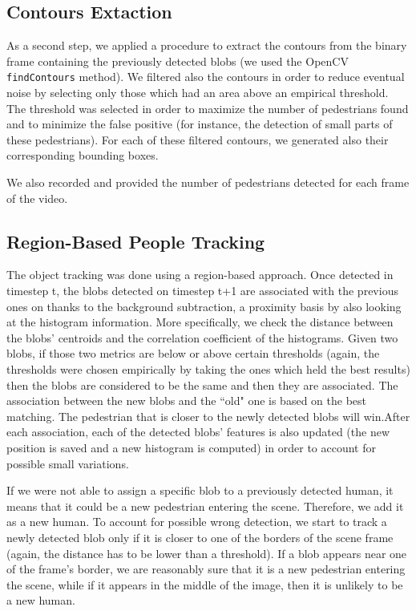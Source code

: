 \documentclass[runningheads]{llncs}
\begin{document}
\subsection{Contours Extaction}
As a second step, we applied a procedure to extract the contours from the binary frame containing the previously detected blobs (we used the OpenCV \texttt{findContours} \cite{findcontours} method). We filtered also the contours in order to reduce eventual noise by selecting only those which had an area above an empirical threshold. The threshold was selected in order to maximize the number of pedestrians found and to minimize the false positive (for instance, the detection of small parts of these pedestrians).  For each of these filtered contours, we generated also their corresponding bounding boxes.

We also recorded and provided the number of pedestrians detected for each frame of the video. 


\subsection{Region-Based People Tracking}

The object tracking was done using a region-based approach. Once detected in timestep t, the blobs detected on timestep t+1 are associated with the previous ones on thanks to the background subtraction, a proximity basis by also looking at the histogram information. More specifically, we check the distance between the blobs' centroids and the correlation coefficient of the histograms. Given two blobs, if those two metrics are below or above certain thresholds (again, the thresholds were chosen empirically by taking the ones which held the best results) then the blobs are considered to be the same and then they are associated. The association between the new blobs and the ``old" one is based on the best matching. The pedestrian that is closer to the newly detected blobs will win.After each association, each of the detected blobs' features is also updated (the new position is saved and a new histogram is computed) in order to account for possible small variations.

If we were not able to assign a specific blob to a previously detected human, it means that it could be a new pedestrian entering the scene. Therefore, we add it as a new human. To account for possible wrong detection, we start to track a newly detected blob only if it is closer to one of the borders of the scene frame (again, the distance has to be lower than a threshold). If a blob appears near one of the frame's border, we are reasonably sure that it is a new pedestrian entering the scene, while if it appears in the middle of the image, then it is unlikely to be a new human.
\end{document}
